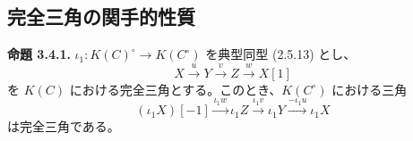 \subsection{完全三角の関手的性質}

\noindent\textbf{命題 3.4.1.}\quad
$\iota_1\colon K(C)^{\circ}\longrightarrow K(C^{\circ})$ を典型同型
(2.5.13) とし、
\[
  X\xrightarrow{u}Y\xrightarrow{v}Z\xrightarrow{w}X[1]
\]
を $K(C)$ における完全三角とする。このとき、$K(C^{\circ})$ における三角
\[
  (\iota_1X)[-1]\xrightarrow{\iota_1w}\iota_1Z
  \xrightarrow{\iota_1v}\iota_1Y
  \xrightarrow{-\iota_1u}\iota_1X
\]
は完全三角である。
\endgroup

